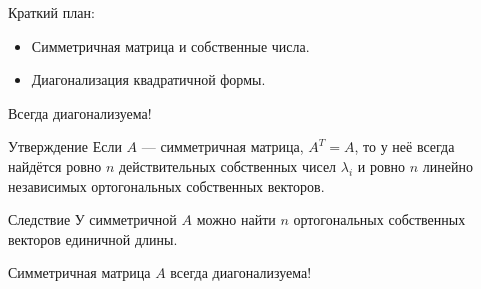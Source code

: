 
\begin{frame} %


\end{frame}



\begin{frame}{Краткий план:}
  \begin{itemize}[<+->]
    \item Симметричная матрица и собственные числа.
    \item Диагонализация квадратичной формы.
  \end{itemize}

\end{frame}


\begin{frame}{Всегда диагонализуема!}
    \begin{block}{Утверждение}
        Если $A$ — симметричная матрица, $A^T = A$, то у неё всегда найдётся
        ровно $n$ \alert{действительных} собственных чисел $\lambda_i$ \pause 
        и ровно $n$ линейно независимых \alert{ортогональных} собственных векторов.
    \end{block}
    \pause
    \begin{block}{Следствие}
        У симметричной $A$ можно найти $n$ ортогональных собственных векторов единичной длины.

        Симметричная матрица $A$ всегда диагонализуема!
    \end{block}
\end{frame}    


